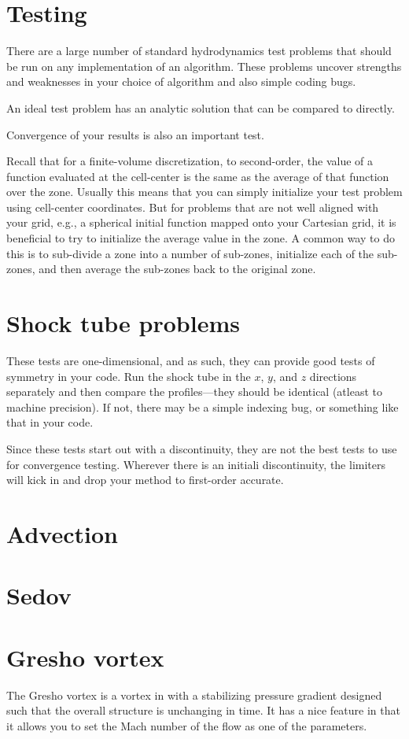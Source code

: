 \section{Testing}

There are a large number of standard hydrodynamics test problems that
should be run on any implementation of an algorithm.  These problems
uncover strengths and weaknesses in your choice of algorithm and also
simple coding bugs.

An ideal test problem has an analytic solution that can be compared to
directly.

Convergence of your results is also an important test.

Recall that for a finite-volume discretization, to second-order, the
value of a function evaluated at the cell-center is the same as the
average of that function over the zone.  Usually this means that you
can simply initialize your test problem using cell-center coordinates.
But for problems that are not well aligned with your grid, e.g., a
spherical initial function mapped onto your Cartesian grid, it is
beneficial to try to initialize the average value in the zone.  A
common way to do this is to sub-divide a zone into a number of
sub-zones, initialize each of the sub-zones, and then average the
sub-zones back to the original zone.  


\section{Shock tube problems}


These tests are one-dimensional, and as such, they can provide good
tests of symmetry in your code.  Run the shock tube in the $x$, $y$,
and $z$ directions separately and then compare the profiles---they
should be identical (atleast to machine precision).  If not, there may
be a simple indexing bug, or something like that in your code.

Since these tests start out with a discontinuity, they are not the
best tests to use for convergence testing.  Wherever there is an
initiali discontinuity, the limiters will kick in and drop your
method to first-order accurate.


\section{Advection}


\section{Sedov}



\section{Gresho vortex}

The Gresho vortex is a vortex in with a stabilizing pressure gradient
designed such that the overall structure is unchanging in time.  It
has a nice feature in that it allows you to set the Mach number of
the flow as one of the parameters.


